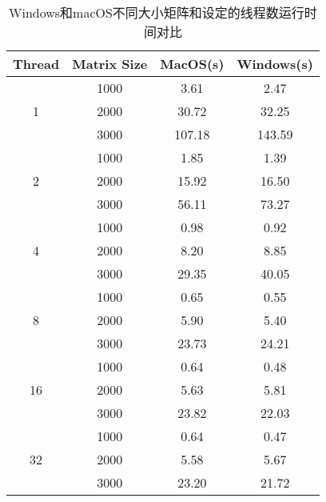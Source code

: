 \documentclass{article}
\begin{document}
\subsection{}
\begin{table}[ht]
    \centering
    \begin{tabular}{cccc}
    \toprule
    \textbf{Thread} & \textbf{Matrix Size} & \textbf{MacOS(s)} & \textbf{Windows(s)} \\
    \midrule
    \multirow{3}{*}{1} & 1000 & 3.61 & 2.47 \\
                       & 2000 & 30.72 & 32.25 \\
                       & 3000 & 107.18 & 143.59 \\
    \midrule
    \multirow{3}{*}{2} & 1000 & 1.85 & 1.39 \\
                       & 2000 & 15.92 & 16.50 \\
                       & 3000 & 56.11 & 73.27 \\
    \midrule
    \multirow{3}{*}{4} & 1000 & 0.98 & 0.92 \\
                       & 2000 & 8.20 & 8.85 \\
                       & 3000 & 29.35 & 40.05 \\
    \midrule
    \multirow{3}{*}{8} & 1000 & 0.65 & 0.55 \\
                       & 2000 & 5.90 & 5.40 \\
                       & 3000 & 23.73 & 24.21 \\
    \midrule
    \multirow{3}{*}{16} & 1000 & 0.64 & 0.48 \\
                        & 2000 & 5.63 & 5.81 \\
                        & 3000 & 23.82 & 22.03 \\
    \midrule
    \multirow{3}{*}{32} & 1000 & 0.64 & 0.47 \\
                        & 2000 & 5.58 & 5.67 \\
                        & 3000 & 23.20 & 21.72 \\
    \bottomrule
    \end{tabular}
    \caption{Windows和macOS不同大小矩阵和设定的线程数运行时间对比}
\end{table}
\end{document}
